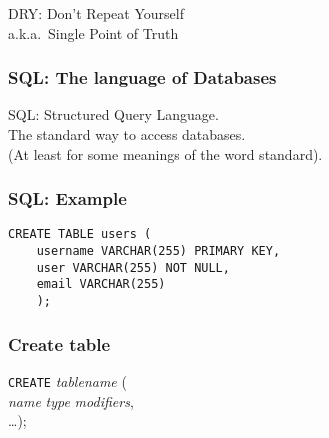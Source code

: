 \begin{frame}[fragile]

DRY: Don't Repeat Yourself\\
a.k.a.\ Single Point of Truth

\end{frame}

\begin{frame}[fragile]
\frametitle{SQL: The language of Databases}

\alert{SQL}: Structured Query Language.\\
The standard way to access databases.\\

\medskip
(At least for some meanings of the word \alert{standard}).
\end{frame}

\begin{frame}[fragile]
\frametitle{SQL: Example}
\begin{verbatim}
CREATE TABLE users (
    username VARCHAR(255) PRIMARY KEY,
    user VARCHAR(255) NOT NULL,
    email VARCHAR(255)
    );
\end{verbatim}
\end{frame}

\begin{frame}[fragile]
\frametitle{Create table}

\texttt{CREATE} \textit{tablename} (\\
    \textit{name} \textit{type} \textit{modifiers},\\
    \ldots);
\end{frame}

